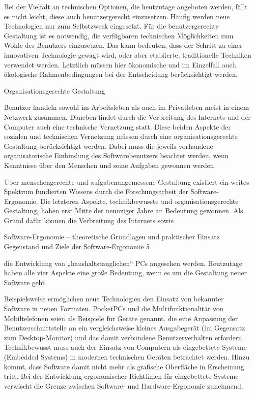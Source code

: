 \documentclass[a4paper, 12pt, twoside, BCOR=20mm, DIV=calc, abstracton, parskip=half*, toc=bibliography, toc=listof, headsepline, footsepline, headings=small, numbers=enddot]{scrreprt}
\begin{document}
		Bei der Vielfalt an technischen Optionen, die heutzutage angeboten werden, fällt es nicht leicht, diese auch benutzergerecht einzusetzen. Häufig werden neue Technologien nur zum Selbstzweck eingesetzt. Für die benutzergerechte Gestaltung ist es notwendig, die verfügbaren technischen Möglichkeiten zum Wohle des Benutzers einzusetzen. Das kann bedeuten, dass der Schritt zu einer innovativen Technologie gewagt wird, oder aber etablierte, traditionelle Techniken verwendet werden. Letztlich müssen hier ökonomische und im Einzelfall auch ökologische Rahmenbedingungen bei der Entscheidung berücksichtigt werden.
		
		Organisationsgerechte Gestaltung
		
		Benutzer handeln sowohl im Arbeitsleben als auch im Privatleben meist in einem Netzwerk zusammen. Daneben findet durch die Verbreitung des Internets und der Computer auch eine technische Vernetzung statt. Diese beiden Aspekte der sozialen und technischen Vernetzung müssen durch eine organisationsgerechte Gestaltung berücksichtigt werden. Dabei muss die jeweils vorhandene organisatorische Einbindung des Softwarebenutzers beachtet werden, wenn Kenntnisse über den Menschen und seine Aufgaben gewonnen werden.
		
		Über menschengerechte und aufgabenangemessene Gestaltung existiert ein weites Spektrum fundierten Wissens durch die Forschungsarbeit der Software-Ergonomie. Die letzteren Aspekte, technikbewusste und organisationsgerechte Gestaltung, haben erst Mitte der neunziger Jahre an Bedeutung gewonnen. Als Grund dafür können die Verbreitung des Internets sowie
		
		Software-Ergonomie – theoretische Grundlagen und praktischer Einsatz Gegenstand und Ziele der Software-Ergonomie 5
		
		die Entwicklung von „haushaltstauglichen“ PCs angesehen werden. Heutzutage haben alle vier Aspekte eine große Bedeutung, wenn es um die Gestaltung neuer Software geht.
		
		Beispielsweise ermöglichen neue Technologien den Einsatz von bekannter Software in neuen Formaten. PocketPCs und die Multifunktionalität von Mobiltelefonen seien als Beispiele für Geräte genannt, die eine Anpassung der Benutzerschnittstelle an ein vergleichsweise kleines Ausgabegerät (im Gegensatz zum Desktop-Monitor) und das damit verbundene Benutzerverhalten erfordern. Technikbewusst muss auch der Einsatz von Computern als eingebettete Systeme (Embedded Systems) in modernen technischen Geräten betrachtet werden. Hinzu kommt, dass Software damit nicht mehr als grafische Oberfläche in Erscheinung tritt. Bei der Entwicklung ergonomischer Richtlinien für eingebettete Systeme verwischt die Grenze zwischen Software- und Hardware-Ergonomie zunehmend.
		
\end{document}
